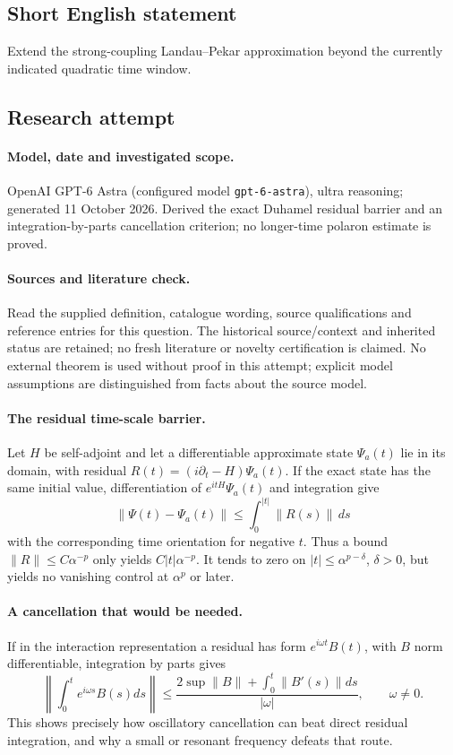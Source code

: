 \documentclass[11pt]{article}
\begin{document}
\subsection{Short English statement}
Extend the strong-coupling Landau--Pekar approximation beyond the currently indicated quadratic time window.
\subsection{Research attempt}
\paragraph{Model, date and investigated scope.}
OpenAI GPT-6 Astra (configured model \texttt{gpt-6-astra}), ultra reasoning; generated 11 October 2026. Derived the exact Duhamel residual barrier and an integration-by-parts cancellation criterion; no longer-time polaron estimate is proved.

\paragraph{Sources and literature check.}
Read the supplied definition, catalogue wording, source qualifications and reference entries for this question. The historical source/context and inherited status are retained; no fresh literature or novelty certification is claimed. No external theorem is used without proof in this attempt; explicit model assumptions are distinguished from facts about the source model.

\paragraph{The residual time-scale barrier.} Let \(H\) be self-adjoint and let a differentiable approximate state \(\Psi_a(t)\) lie in its domain, with residual \(R(t)=(i\partial_t-H)\Psi_a(t)\). If the exact state has the same initial value, differentiation of \(e^{itH}\Psi_a(t)\) and integration give
\[
 \|\Psi(t)-\Psi_a(t)\|\le\int_0^{|t|}\|R(s)\|\,ds
\]
with the corresponding time orientation for negative \(t\). Thus a bound \(\|R\|\le C\alpha^{-p}\) only yields \(C|t|\alpha^{-p}\). It tends to zero on \(|t|\le\alpha^{p-\delta}\), \(\delta>0\), but yields no vanishing control at \(\alpha^p\) or later.
\paragraph{A cancellation that would be needed.} If in the interaction representation a residual has form \(e^{i\omega t}B(t)\), with \(B\) norm differentiable, integration by parts gives
\[
 \left\|\int_0^t e^{i\omega s}B(s)ds\right\|
 \le\frac{2\sup\|B\|+\int_0^t\|B'(s)\|ds}{|\omega|},\qquad\omega\ne0.
\]
This shows precisely how oscillatory cancellation can beat direct residual integration, and why a small or resonant frequency defeats that route.
\end{document}
